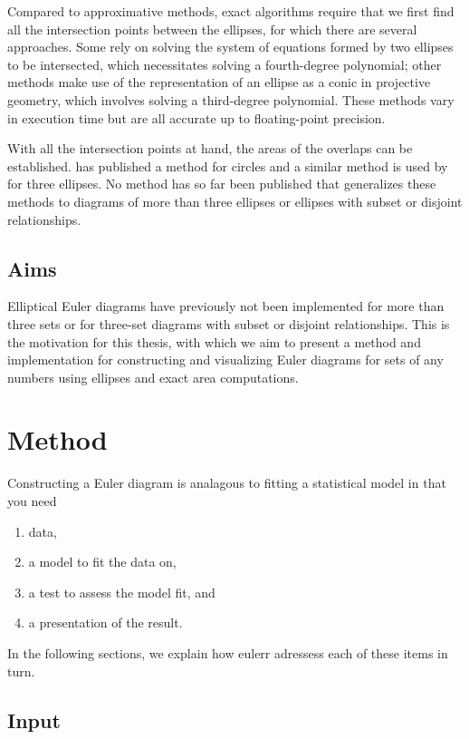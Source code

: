 \documentclass[
  oneside,
  openany,
  numbers=noendperiod,
  parskip=half,
  bibliography=totoc
]{scrbook}\usepackage[]{graphicx}\usepackage{xcolor}
\newcommand{\pkg}[1]{{\fontseries{b}\selectfont #1}}
\begin{document}
Compared to approximative methods, exact algorithms require that we
first find all the intersection points between the ellipses, for which there are
several approaches. Some rely on solving the system of equations formed by two
ellipses to be intersected, which necessitates solving a fourth-degree
polynomial; other methods make use of the representation of an ellipse as a
conic in projective geometry, which involves solving a third-degree polynomial.
These methods vary in execution time but are all accurate up to
floating-point precision.

With all the intersection points at hand, the areas of the overlaps can be
established. \citet{frederickson_2013} has published a method for circles
and a similar method is used by \citet{micallef_2013} for three ellipses. No
method has so far been published that
generalizes these methods to diagrams of more than three ellipses or ellipses
with subset or disjoint relationships.

\section{Aims}
\label{sec:aims}

Elliptical Euler diagrams have previously not been implemented for more than
three sets or for three-set diagrams with subset or disjoint relationships. This
is the motivation for this thesis, with which we aim to present
a method and implementation for constructing and visualizing Euler diagrams for
sets of any numbers using ellipses and exact area computations.

\chapter{Method}
\label{ch:method}

Constructing a Euler diagram is analagous to fitting a statistical model in that
you need
\begin{enumerate}
\item data,
\item a model to fit the data on,
\item a test to assess the model fit, and
\item a presentation of the result.
\end{enumerate}
In the following sections, we explain how \pkg{eulerr} adressess each of these
items in turn.

\section{Input}
\label{sec:input}
\end{document}

